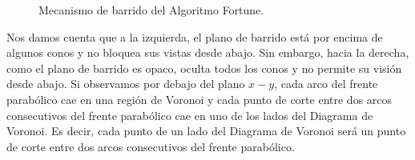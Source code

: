 \begin{figure}[H]
{    }
    \begin{center}
    \end{center}
    \caption{Mecanismo de barrido del Algoritmo Fortune. } \label{fig:incre} 
\end{figure} 

Nos damos cuenta que a la izquierda, el plano de barrido está por encima de algunos conos y no bloquea sus vistas desde abajo. Sin embargo, hacia la derecha, como el plano de barrido es opaco, oculta todos los conos y no permite su visión desde abajo.
Si observamos por debajo del plano $x-y$, cada arco del frente parabólico cae en una región de Voronoi y cada punto de corte entre dos arcos consecutivos del frente parabólico cae en uno de los lados del Diagrama de Voronoi. Es decir, cada punto de un lado del Diagrama de Voronoi será un punto de corte entre dos arcos consecutivos del frente parabólico.
\vspace{0.3cm}

